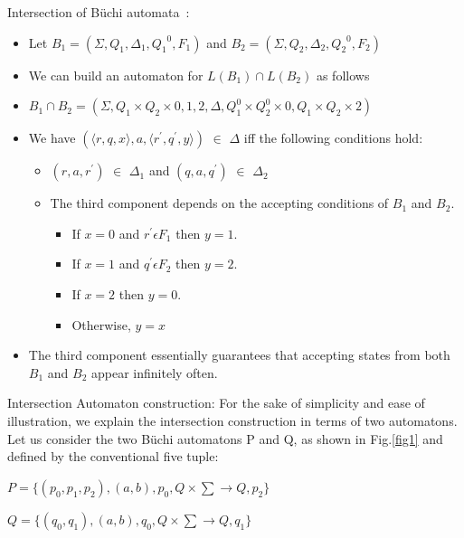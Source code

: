 \begin{definition}Intersection of B\"{u}chi automata~\cite{product}:
\begin{itemize}
 \item Let $B_1 = (\Sigma,Q_1,\Delta_1,{Q_1}^0,F_1)$ and $B_2 = (\Sigma,Q_2,\Delta_2,{Q_2}^0,F_2)$
 \item We can build an automaton for $L(B_1)\cap L(B_2)$ as follows
 \item $B_1 \cap B_2 = (\Sigma, Q_1 \times Q_2 \times {0,1,2},\Delta, Q^0_1 \times Q^0_2 \times
       {0}, Q_1 \times Q_2 \times {2})$
 \item We have $(\langle r,q,x \rangle,a,\langle r^{'},q^{'},y \rangle)$ $\in$ $\Delta$ iff the 
       following conditions hold:
        \begin{itemize}
          \item $(r,a,r^{'})$ $\in$ $\Delta_1$ and $ (q,a,q^{'})$ $\in$ $\Delta_2$
          \item The third component depends on the accepting conditions of $B_1$ and $B_2$.
            \begin{itemize}
             \item If $x = 0$ and $r^{'} \epsilon F_1$ then $y = 1$.
             \item If $x = 1$ and $q^{'} \epsilon F_2$ then $y = 2$.
             \item If $x = 2$ then $y = 0$.
             \item Otherwise, $y = x$
            \end{itemize}

        \end{itemize}
 \item The third component essentially guarantees that accepting states from both $B_1$ and
       $B_2$ appear infinitely often. \\
\end{itemize}
\end{definition}

\noindent
Intersection Automaton construction:
\noindent
For the sake of simplicity and ease of illustration, 
we explain the intersection construction in terms of two automatons. 
Let us consider the two B\"{u}chi automatons P and Q, as shown in Fig.\ref{fig1} and defined by the
conventional five tuple:

$P = \{(p_0,p_1,p_2),(a,b),p_0, Q \times \sum \rightarrow Q,p_2\}$

$Q = \{(q_0,q_1),(a,b),q_0, Q \times \sum \rightarrow Q,q_1\}$ \\

